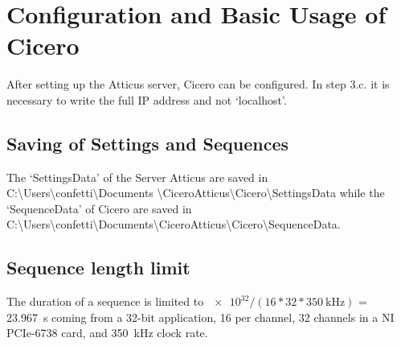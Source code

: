 \section{Configuration and Basic Usage of Cicero}\label{sec:Cicero, Configuration and Basic Usage of Cicero}
After setting up the Atticus server, Cicero can be configured. In step 3.c. it is necessary to write the full IP address and not `localhost'.

\subsection*{Saving of Settings and Sequences}\label{sec:Cicero, Saving of Settings and Sequences}
The `SettingsData' of the Server Atticus are saved in C:\textbackslash Users\textbackslash confetti\textbackslash Documents \textbackslash Cicero\textunderscore Atticus\textbackslash Cicero\textbackslash SettingsData while the `SequenceData' of Cicero are saved in C:\textbackslash Users\textbackslash confetti\textbackslash Documents\textbackslash Cicero\textunderscore Atticus\textbackslash Cicero\textbackslash SequenceData.

\subsection*{Sequence length limit}\label{sec:cicero, Sequence length limit}
The duration of a sequence is limited to $\num[exponent-base=2]{e32}/(16*32*\SI{350}{\kilo\hertz})$ = \SI{23.967}{\second} coming from a 32-bit application, \SI{16}{\bit} per channel, 32 channels in a NI PCIe-6738 card, and \SI{350}{\kilo\hertz} clock rate.